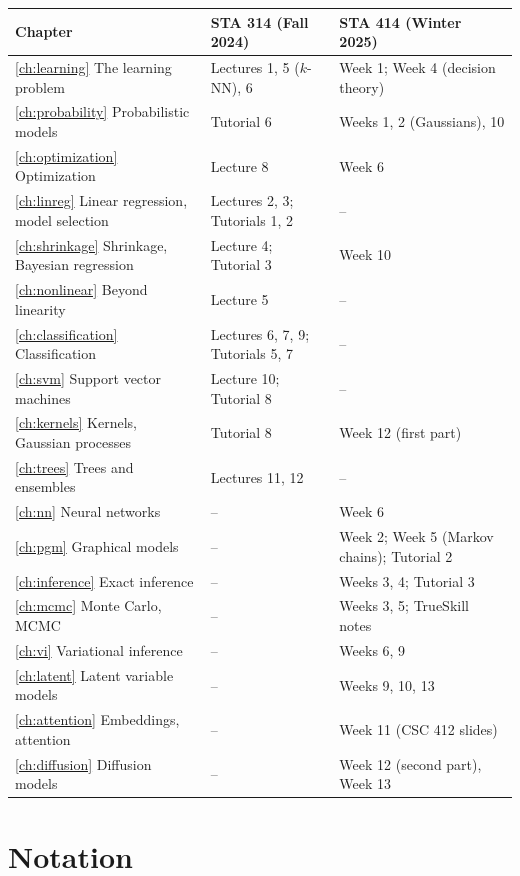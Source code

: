 \begin{center}
\small
\begin{tabularx}{\textwidth}{@{}l>{\raggedright\arraybackslash}X>{\raggedright\arraybackslash}X@{}}
\toprule
Chapter & STA 314 (Fall 2024) & STA 414 (Winter 2025) \\
\midrule
\ref{ch:learning} The learning problem & Lectures 1, 5 ($k$-NN), 6 & Week 1; Week 4 (decision theory) \\
\ref{ch:probability} Probabilistic models & Tutorial 6 & Weeks 1, 2 (Gaussians), 10 \\
\ref{ch:optimization} Optimization & Lecture 8 & Week 6 \\
\ref{ch:linreg} Linear regression, model selection & Lectures 2, 3; Tutorials 1, 2 & -- \\
\ref{ch:shrinkage} Shrinkage, Bayesian regression & Lecture 4; Tutorial 3 & Week 10 \\
\ref{ch:nonlinear} Beyond linearity & Lecture 5 & -- \\
\ref{ch:classification} Classification & Lectures 6, 7, 9; Tutorials 5, 7 & -- \\
\ref{ch:svm} Support vector machines & Lecture 10; Tutorial 8 & -- \\
\ref{ch:kernels} Kernels, Gaussian processes & Tutorial 8 & Week 12 (first part) \\
\ref{ch:trees} Trees and ensembles & Lectures 11, 12 & -- \\
\ref{ch:nn} Neural networks & -- & Week 6 \\
\ref{ch:pgm} Graphical models & -- & Week 2; Week 5 (Markov chains); Tutorial 2 \\
\ref{ch:inference} Exact inference & -- & Weeks 3, 4; Tutorial 3 \\
\ref{ch:mcmc} Monte Carlo, MCMC & -- & Weeks 3, 5; TrueSkill notes \\
\ref{ch:vi} Variational inference & -- & Weeks 6, 9 \\
\ref{ch:latent} Latent variable models & -- & Weeks 9, 10, 13 \\
\ref{ch:attention} Embeddings, attention & -- & Week 11 (CSC 412 slides) \\
\ref{ch:diffusion} Diffusion models & -- & Week 12 (second part), Week 13 \\
\bottomrule
\end{tabularx}
\end{center}

\section*{Notation}

